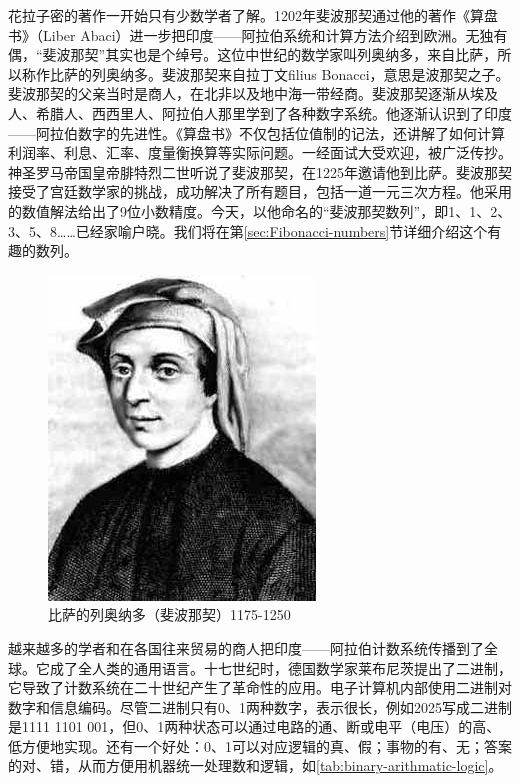 \documentclass[b5paper]{ctexart}
\begin{document}
花拉子密的著作一开始只有少数学者了解。1202年斐波那契通过他的著作《算盘书》（Liber Abaci）进一步把印度——阿拉伯系统和计算方法介绍到欧洲。无独有偶，“斐波那契”其实也是个绰号。这位中世纪的数学家叫列奥纳多，来自比萨，所以称作比萨的列奥纳多。斐波那契来自拉丁文filius Bonacci，意思是波那契之子。斐波那契的父亲当时是商人，在北非以及地中海一带经商。斐波那契逐渐从埃及人、希腊人、西西里人、阿拉伯人那里学到了各种数字系统。他逐渐认识到了印度——阿拉伯数字的先进性。《算盘书》不仅包括位值制的记法，还讲解了如何计算利润率、利息、汇率、度量衡换算等实际问题。一经面试大受欢迎，被广泛传抄。神圣罗马帝国皇帝腓特烈二世听说了斐波那契，在1225年邀请他到比萨。斐波那契接受了宫廷数学家的挑战，成功解决了所有题目，包括一道一元三次方程。他采用的数值解法给出了9位小数精度\cite{Gies-Carney-24}。今天，以他命名的“斐波那契数列”，即1、1、2、3、5、8……已经家喻户晓。我们将在第\ref{sec:Fibonacci-numbers}节详细介绍这个有趣的数列。

\begin{figure}[htbp]
 \centering
 \includegraphics[scale=0.35]{img/Fibonacci}
 \caption{比萨的列奥纳多（斐波那契）1175-1250}
 \label{fig:Fibonacci}
\end{figure}

\label{sec:binary-numerals} 
越来越多的学者和在各国往来贸易的商人把印度——阿拉伯计数系统传播到了全球。它成了全人类的通用语言。十七世纪时，德国数学家莱布尼茨提出了二进制，它导致了计数系统在二十世纪产生了革命性的应用。电子计算机内部使用二进制对数字和信息编码。尽管二进制只有0、1两种数字，表示很长，例如2025写成二进制是1111 1101 001，但0、1两种状态可以通过电路的通、断或电平（电压）的高、低方便地实现。还有一个好处：0、1可以对应逻辑的真、假；事物的有、无；答案的对、错，从而方便用机器统一处理数和逻辑，如\cref{tab:binary-arithmatic-logic}。
\end{document}
